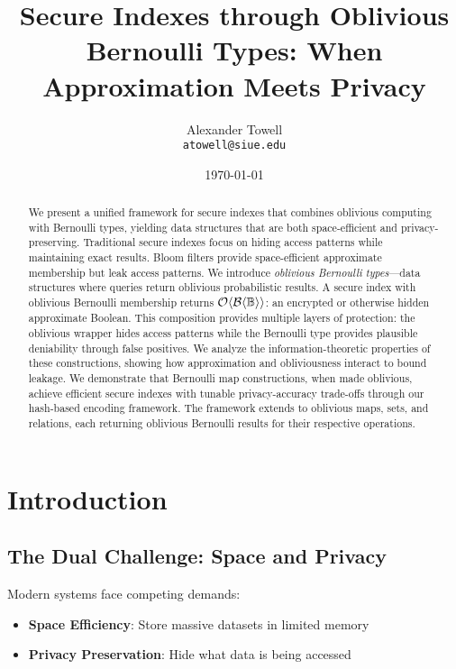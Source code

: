 \documentclass[11pt,final]{article}
\title{Secure Indexes through Oblivious Bernoulli Types: When Approximation Meets Privacy}
\author{
    Alexander Towell\\
    \texttt{atowell@siue.edu}
}
\date{\today}
\newcommand{\BernBool}{\mathcal{B}\langle \Bool \rangle}
\begin{document}
\maketitle

\begin{abstract}
We present a unified framework for secure indexes that combines oblivious computing with Bernoulli types, yielding data structures that are both space-efficient and privacy-preserving. Traditional secure indexes focus on hiding access patterns while maintaining exact results. Bloom filters provide space-efficient approximate membership but leak access patterns. We introduce \emph{oblivious Bernoulli types}—data structures where queries return oblivious probabilistic results. A secure index with oblivious Bernoulli membership returns $\Obv{\BernBool}$: an encrypted or otherwise hidden approximate Boolean. This composition provides multiple layers of protection: the oblivious wrapper hides access patterns while the Bernoulli type provides plausible deniability through false positives. We analyze the information-theoretic properties of these constructions, showing how approximation and obliviousness interact to bound leakage. We demonstrate that Bernoulli map constructions, when made oblivious, achieve efficient secure indexes with tunable privacy-accuracy trade-offs through our hash-based encoding framework. The framework extends to oblivious maps, sets, and relations, each returning oblivious Bernoulli results for their respective operations.
\end{abstract}


\ObliviousNotationGuide

\section{Introduction}

\subsection{The Dual Challenge: Space and Privacy}

Modern systems face competing demands:
\begin{itemize}
    \item \textbf{Space Efficiency}: Store massive datasets in limited memory
    \item \textbf{Privacy Preservation}: Hide what data is being accessed
\end{itemize}
\end{document}
